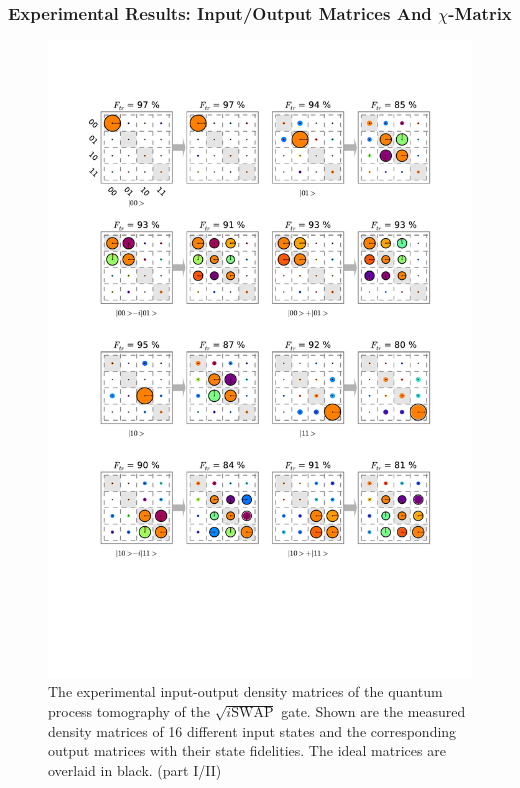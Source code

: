 \subsubsection{Experimental Results: Input/Output Matrices And $\chi$-Matrix}

\begin{figure}[p]
	\centering
		\includegraphics[width=1.0\textwidth]{"./data/ct5/2011_04_21 - grover and tomo/good_data/process -matrices 1"}
	\caption{The experimental input-output density matrices of the quantum process tomography of the $\sqrt{i\mathrm{SWAP}}$ gate. Shown are the measured density matrices of 16 different input states and the corresponding output matrices with their state fidelities. The ideal matrices are overlaid in black. (part I/II)}
	\label{fig:process_matrices_1}
\end{figure}

